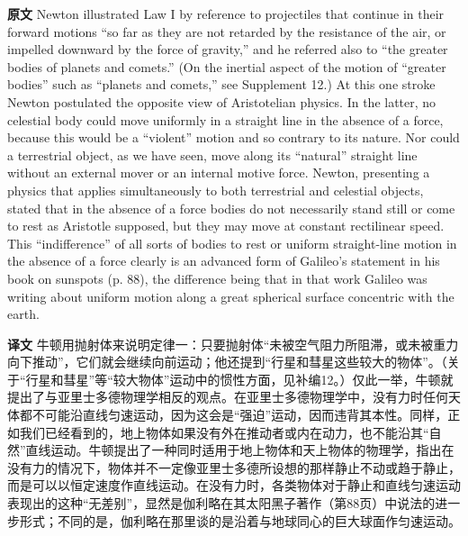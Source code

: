 \documentclass[UTF8,zihao=-4]{ctexart}
\begin{document}
\noindent\textbf{原文} Newton illustrated Law I by reference to projectiles that continue in their forward motions ``so far as they are not retarded by the resistance of the air, or impelled downward by the force of gravity,'' and he referred also to ``the greater bodies of planets and comets.'' (On the inertial aspect of the motion of ``greater bodies'' such as ``planets and comets,'' see Supplement 12.) At this one stroke Newton postulated the opposite view of Aristotelian physics. In the latter, no celestial body could move uniformly in a straight line in the absence of a force, because this would be a ``violent'' motion and so contrary to its nature. Nor could a terrestrial object, as we have seen, move along its ``natural'' straight line without an external mover or an internal motive force. Newton, presenting a physics that applies simultaneously to both terrestrial and celestial objects, stated that in the absence of a force bodies do not necessarily stand still or come to rest as Aristotle supposed, but they may move at constant rectilinear speed. This ``indifference'' of all sorts of bodies to rest or uniform straight-line motion in the absence of a force clearly is an advanced form of Galileo's statement in his book on sunspots (p. 88), the difference being that in that work Galileo was writing about uniform motion along a great spherical surface concentric with the earth.
\par\noindent\textbf{译文} 牛顿用抛射体来说明定律一：只要抛射体“未被空气阻力所阻滞，或未被重力向下推动”，它们就会继续向前运动；他还提到“行星和彗星这些较大的物体”。（关于“行星和彗星”等“较大物体”运动中的惯性方面，见补编12。）仅此一举，牛顿就提出了与亚里士多德物理学相反的观点。在亚里士多德物理学中，没有力时任何天体都不可能沿直线匀速运动，因为这会是“强迫”运动，因而违背其本性。同样，正如我们已经看到的，地上物体如果没有外在推动者或内在动力，也不能沿其“自然”直线运动。牛顿提出了一种同时适用于地上物体和天上物体的物理学，指出在没有力的情况下，物体并不一定像亚里士多德所设想的那样静止不动或趋于静止，而是可以以恒定速度作直线运动。在没有力时，各类物体对于静止和直线匀速运动表现出的这种“无差别”，显然是伽利略在其太阳黑子著作（第88页）中说法的进一步形式；不同的是，伽利略在那里谈的是沿着与地球同心的巨大球面作匀速运动。
\medskip
\end{document}
